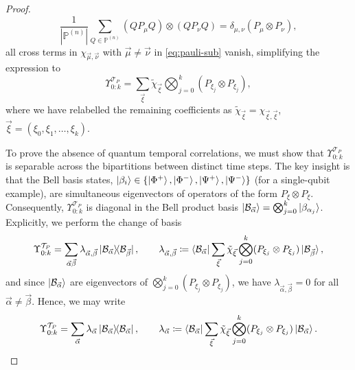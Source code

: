 \documentclass[
    aps,
    prx,
    reprint,
    superscriptaddress,
    longbibliography,
    nofootinbib,
    floatfix,
]{revtex4-2}
\newcommand{\ketbra}[2]{\ket{#1}\!\!\bra{#2}}  %
\begin{document}
\begin{proof}
    \begin{equation}
        \frac{1}{|\mathbb{P}^{(n)}|}\sum_{Q\in\mathbb{P}^{(n)}} (Q P_{\mu} Q) \otimes (Q P_{\nu} Q) = \delta_{\mu,\nu} (P_{\mu} \otimes P_{\nu}),
    \end{equation}
    all cross terms in \(\chi_{\vec{\mu},\vec{\nu}}\) with \(\vec{\mu} \neq \vec{\nu}\) in \cref{eq:pauli-sub} vanish, simplifying the expression to
    \begin{equation}
        \Upsilon_{0:k}^{\mathcal{T}_P} = \sum_{\vec{\xi}} \tilde{\chi}_{\vec{\xi}} \bigotimes_{j=0}^k (P_{\xi_j} \otimes P_{\xi_j}),
    \end{equation}
    where we have relabelled the remaining coefficients as \(\tilde{\chi}_{\vec{\xi}} = \chi_{\vec{\xi},\vec{\xi}}\), \(\vec{\xi} = (\xi_0, \xi_1, \dots, \xi_k)\).

    To prove the absence of quantum temporal correlations, we must show that \(\Upsilon_{0:k}^{\mathcal{T}_P}\) is separable across the bipartitions between distinct time steps. The key insight is that the Bell basis states, \(\ket{\beta_i} \in \{\ket{\Phi^+}, \ket{\Phi^-}, \ket{\Psi^+}, \ket{\Psi^-}\}\) (for a single-qubit example), are simultaneous eigenvectors of operators of the form \(P_\xi \otimes P_\xi\). Consequently, \(\Upsilon_{0:k}^{\mathcal{T}_P}\) is diagonal in the Bell product basis \(\ket{\mathcal{B}_{\vec{\alpha}}}=\bigotimes_{j=0}^k \ket{\beta_{\alpha_j}}\). Explicitly, we perform the change of basis
    \begin{equation}
        \Upsilon_{0:k}^{\mathcal{T}_P} 
        =
        \sum_{{\vec{\alpha}}{\vec{\beta}}} \lambda_{\vec{\alpha},\vec{\beta}} \ketbra{\mathcal{B}_{\vec{\alpha}}}{\mathcal{B}_{\vec{\beta}}}, 
        \qquad
        \lambda_{\vec{\alpha},\vec{\beta}} 
        \coloneq 
        \bra{\mathcal{B}_{\vec{\alpha}}} 
        \sum_{\vec{\xi}} \tilde{\chi}_{\vec{\xi}} \bigotimes_{j=0}^k (P_{\xi_j} \otimes P_{\xi_j})
        \ket{\mathcal{B}_{\vec{\beta}}},
    \end{equation}
    and since \(\ket{\mathcal{B}_{\vec{\alpha}}}\) are eigenvectors of \(\bigotimes_{j=0}^k (P_{\xi_j} \otimes P_{\xi_j})\), we have \(\lambda_{\vec{\alpha},\vec{\beta}} = 0\) for all \(\vec{\alpha} \neq \vec{\beta}\). Hence, we may write
    \begin{equation}\label{eq:bell-basis-decomposition}
        \Upsilon_{0:k}^{\mathcal{T}_P} 
        =
        \sum_{\vec{\alpha}} \lambda_{\vec{\alpha}} \ketbra{\mathcal{B}_{\vec{\alpha}}}{\mathcal{B}_{\vec{\alpha}}},
        \qquad
        \lambda_{\vec{\alpha}} 
        \coloneq
        \bra{\mathcal{B}_{\vec{\alpha}}} 
        \sum_{\vec{\xi}} \tilde{\chi}_{\vec{\xi}} \bigotimes_{j=0}^k (P_{\xi_j} \otimes P_{\xi_j})
        \ket{\mathcal{B}_{\vec{\alpha}}}.
    \end{equation}


\end{proof}
\end{document}
